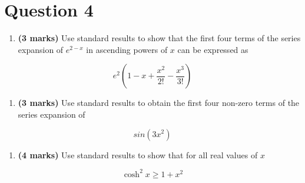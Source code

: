 \documentclass[
  a4paper,
]{report}
\providecommand{\tightlist}{%
  \setlength{\itemsep}{0pt}\setlength{\parskip}{0pt}}\usepackage{longtable,booktabs,array}
\begin{document}
\section{Question 4}\label{question-4}

\begin{enumerate}
\def\labelenumi{\alph{enumi}.}
\tightlist
\item
  \textbf{(3 marks)} Use standard results to show that the first four
  terms of the series expansion of \(e^{2-x}\) in ascending powers of
  \(x\) can be expressed as
\end{enumerate}

\[e^2\left(1-x+\frac{x^2}{2!}-\frac{x^3}{3!}\right)\]

\begin{enumerate}
\def\labelenumi{\alph{enumi}.}
\setcounter{enumi}{1}
\tightlist
\item
  \textbf{(3 marks)} Use standard results to obtain the first four
  non-zero terms of the series expansion of
\end{enumerate}

\[sin{(3x^2)}\]

\begin{enumerate}
\def\labelenumi{\alph{enumi}.}
\setcounter{enumi}{2}
\tightlist
\item
  \textbf{(4 marks)} Use standard results to show that for all real
  values of \(x\)
\end{enumerate}

\[\cosh^{2}{x \geq 1 + x^{2}}\]
\end{document}
